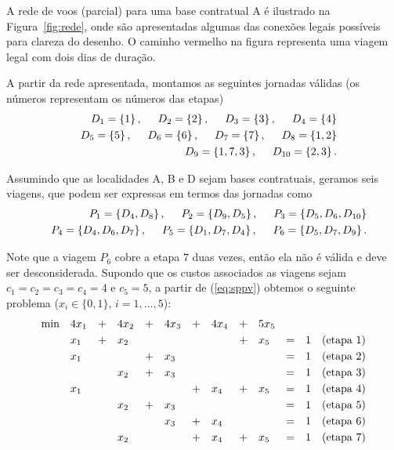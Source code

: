 A rede de voos (parcial) para uma base contratual A é ilustrado na Figura~\ref{fig:rede}, onde são
apresentadas algumas das conexões legais possíveis para clareza do desenho. O caminho vermelho
na figura representa uma viagem legal com dois dias de duração. 

A partir da rede apresentada, montamos as seguintes jornadas válidas (os números representam os
números das etapas)
%
\begin{eqnarray*}
	&& D_1 = \{1\} \, , \hspace{0.5cm} D_2 = \{2\} \, , \hspace{0.5cm} D_3 = \{3\} \, , \hspace{0.5cm} D_4 = \{4\} \\
	&& D_5 = \{5\} \, , \hspace{0.5cm} D_6 = \{6\} \, , \hspace{0.5cm} D_7 = \{7\} \, , \hspace{0.5cm} D_8 = \{1, 2\} \\
	&& D_9 = \{1, 7 ,3\} \, , \hspace{0.5cm} D_{10} = \{2, 3\} \, . 
\end{eqnarray*}

Assumindo que as localidades A, B e D sejam bases contratuais, geramos seis viagens, que podem ser
expressas em termos das jornadas como 
%
\begin{eqnarray*}
	&& P_1 = \{D_4, D_8\} \, , \hspace{0.5cm} P_2 = \{D_9, D_5\} \, , \hspace{0.5cm} P_3 = \{D_5, D_6, D_{10}\} \\
	&& P_4 = \{D_4, D_6, D_7\} \, , \hspace{0.5cm} P_5 = \{D_1, D_7, D_4\} \, , \hspace{0.5cm} P_6 = \{D_5, D_7, D_9\} \, . 
\end{eqnarray*}

Note que a viagem $P_6$ cobre a etapa $7$ duas vezes, então ela não é válida e deve ser 
desconsiderada. Supondo que os custos associados as viagens sejam $c_1 = c_2 = c_3 = c_4 = 4$ e
$c_5 = 5$, a partir de (\ref{eq:sppv}) obtemos o seguinte problema ($x_i \in \{0, 1\}$, 
$i=1, \ldots, 5$):
%
\begin{equation*}
	\begin{array}{lllllllllllll}
		\text{min} & 4x_1 & + & 4x_2 & + & 4x_3 & + & 4x_4 & + & 5 x_5 & & & \vsp \\ 
		& x_1 & + & x_2 & & & & & + & x_5 & = & 1 & \text{(etapa 1)} \vsp \\
		& x_1 & & & + & x_3 & & & & & = & 1 & \text{(etapa 2)} \vsp \\
		& & & x_2 & + & x_3 & & & & & = & 1 & \text{(etapa 3)} \vsp \\
		& x_1 & & & & & + & x_4 & + & x_5 & = & 1 & \text{(etapa 4)} \vsp \\
		& & & x_2 & + & x_3 & & & & & = & 1 & \text{(etapa 5)} \vsp \\
		& & & & & x_3 & + & x_4 & & & = & 1 & \text{(etapa 6)} \vsp \\
		& & & x_2 & & & + & x_4 & + & x_5 & = & 1 & \text{(etapa 7)}
	\end{array}
\end{equation*}

